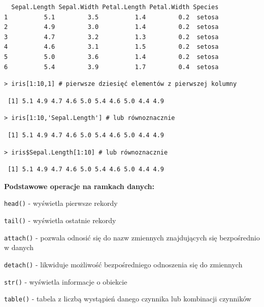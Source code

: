 \documentclass[12pt,B5paper,]{book}
\begin{document}
\begin{verbatim}
  Sepal.Length Sepal.Width Petal.Length Petal.Width Species
1          5.1         3.5          1.4         0.2  setosa
2          4.9         3.0          1.4         0.2  setosa
3          4.7         3.2          1.3         0.2  setosa
4          4.6         3.1          1.5         0.2  setosa
5          5.0         3.6          1.4         0.2  setosa
6          5.4         3.9          1.7         0.4  setosa
\end{verbatim}

\begin{verbatim}
> iris[1:10,1] # pierwsze dziesięć elementów z pierwszej kolumny
\end{verbatim}

\begin{verbatim}
 [1] 5.1 4.9 4.7 4.6 5.0 5.4 4.6 5.0 4.4 4.9
\end{verbatim}

\begin{verbatim}
> iris[1:10,'Sepal.Length'] # lub równoznacznie
\end{verbatim}

\begin{verbatim}
 [1] 5.1 4.9 4.7 4.6 5.0 5.4 4.6 5.0 4.4 4.9
\end{verbatim}

\begin{verbatim}
> iris$Sepal.Length[1:10] # lub równoznacznie
\end{verbatim}

\begin{verbatim}
 [1] 5.1 4.9 4.7 4.6 5.0 5.4 4.6 5.0 4.4 4.9
\end{verbatim}

\vspace{0.8cm}

\textbf{Podstawowe operacje na ramkach danych: }

\texttt{head()} - wyświetla pierwsze rekordy

\texttt{tail()} - wyświetla ostatnie rekordy

\texttt{attach()} - pozwala odnosić się do nazw zmiennych znajdujących
się bezpośrednio w danych

\texttt{detach()} - likwiduje możliwość bezpośredniego odnoszenia się do
zmiennych

\texttt{str()} - wyświetla informacje o obiekcie

\texttt{table()} - tabela z liczbą wystąpień danego czynnika lub
kombinacji czynników
\end{document}

